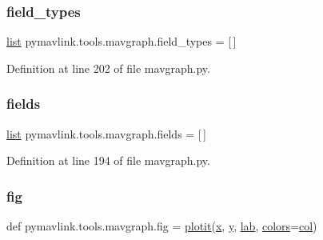 \subsubsection{\texorpdfstring{field\_types}{field\_types}}
{\footnotesize\ttfamily \mbox{\hyperlink{structlist}{list}} pymavlink.\+tools.\+mavgraph.\+field\+\_\+types = \mbox{[}$\,$\mbox{]}}



Definition at line 202 of file mavgraph.\+py.

\mbox{\label{namespacepymavlink_1_1tools_1_1mavgraph_a5ba6a459d544d32a7adf561bba2386d2}} 
\subsubsection{\texorpdfstring{fields}{fields}}
{\footnotesize\ttfamily \mbox{\hyperlink{structlist}{list}} pymavlink.\+tools.\+mavgraph.\+fields = \mbox{[}$\,$\mbox{]}}



Definition at line 194 of file mavgraph.\+py.

\mbox{\label{namespacepymavlink_1_1tools_1_1mavgraph_ac18c2a234fcdd0957038c08ead266890}} 
\subsubsection{\texorpdfstring{fig}{fig}}
{\footnotesize\ttfamily def pymavlink.\+tools.\+mavgraph.\+fig = \mbox{\hyperlink{namespacepymavlink_1_1tools_1_1mavgraph_ac4c25ed1ed8661bb69619e15992c1c81}{plotit}}(\mbox{\hyperlink{namespacepymavlink_1_1tools_1_1mavgraph_a850833f299bc2444a4e9077175f357cb}{x}}, \mbox{\hyperlink{namespacepymavlink_1_1tools_1_1mavgraph_a2083829da277f3d120e2db2239c5ede9}{y}}, \mbox{\hyperlink{namespacepymavlink_1_1tools_1_1mavgraph_a2dd273e216f57a44b6274cb7f46b22dc}{lab}}, \mbox{\hyperlink{namespacepymavlink_1_1tools_1_1mavgraph_a19862d005460bc9f0c104743009a0ff1}{colors}}=\mbox{\hyperlink{namespacepymavlink_1_1tools_1_1mavgraph_af6bb70f02b9d6d3eaab8b0a303c984ed}{col}})}



